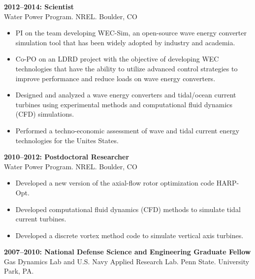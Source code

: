 \vspace{-0.2in}
\textbf{2012--2014: Scientist}\\
Water Power Program. NREL. Boulder, CO\\
\vspace{-0.35in}
\begin{itemize}
  \item PI on the team developing WEC-Sim, an open-source wave energy converter simulation tool that has been widely adopted by industry and academia.
  \vspace{-0.1in}
  \item Co-PO on an LDRD project with the objective of developing WEC technologies that have the ability to utilize advanced control strategies to improve performance and reduce loads on wave energy converters.
  \vspace{-0.1in}
  \item Designed and analyzed a wave energy converters and tidal/ocean current turbines using experimental methods and computational fluid dynamics (CFD) simulations.
  \vspace{-0.1in}
  \item Performed a techno-economic assessment of wave and tidal current energy technologies for the Unites States.
\end{itemize}
\vspace{-0.2in}
\textbf{2010--2012: Postdoctoral Researcher}\\
Water Power Program. NREL. Boulder, CO\\
\vspace{-0.35in}
\begin{itemize}
  \item Developed a new version of the axial-flow rotor optimization code HARP-Opt.
  \vspace{-0.1in}
  \item Developed computational fluid dynamics (CFD) methods to simulate tidal current turbines.
  \vspace{-0.1in}
  \item Developed a discrete vortex method code to simulate vertical axis turbines.
\end{itemize}
\vspace{-0.2in}
\textbf{2007--2010: National Defense Science and Engineering Graduate Fellow}\\
Gas Dynamics Lab and U.S. Navy Applied Research Lab. Penn State. University Park, PA. \\
\vspace{-0.35in}
